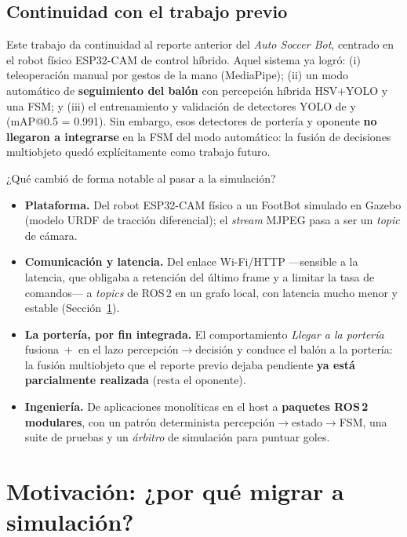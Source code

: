 \documentclass[11pt,a4paper]{article}
\newcommand{\code}[1]{\texttt{\detokenize{#1}}}
\begin{document}
\subsection{Continuidad con el trabajo previo}
Este trabajo da continuidad al reporte anterior del \emph{Auto Soccer Bot}, centrado en el robot físico
ESP32\mbox{-}CAM de control híbrido. Aquel sistema ya logró: (i) teleoperación manual por gestos de la
mano (MediaPipe); (ii) un modo automático de \textbf{seguimiento del balón} con percepción híbrida
HSV+YOLO y una FSM; y (iii) el entrenamiento y validación de detectores YOLO de \code{goal} y
\code{opponent} (mAP@0.5 = 0.991). Sin embargo, esos detectores de portería y oponente \textbf{no
llegaron a integrarse} en la FSM del modo automático: la fusión de decisiones multiobjeto quedó
explícitamente como trabajo futuro.

¿Qué cambió de forma notable al pasar a la simulación?
\begin{itemize}
  \item \textbf{Plataforma.} Del robot ESP32\mbox{-}CAM físico a un FootBot simulado en Gazebo (modelo
  URDF de tracción diferencial); el \emph{stream} MJPEG pasa a ser un \emph{topic} de cámara.
  \item \textbf{Comunicación y latencia.} Del enlace Wi\mbox{-}Fi/HTTP —sensible a la latencia, que
  obligaba a retención del último frame y a limitar la tasa de comandos— a \emph{topics} de ROS\,2 en un
  grafo local, con latencia mucho menor y estable (Sección~\ref{sec:motivacion}).
  \item \textbf{La portería, por fin integrada.} El comportamiento \emph{Llegar a la portería} fusiona
  \code{ball}\,+\,\code{goal} en el lazo percepción$\to$decisión y conduce el balón a la portería: la
  fusión multiobjeto que el reporte previo dejaba pendiente \textbf{ya está parcialmente realizada}
  (resta el oponente).
  \item \textbf{Ingeniería.} De aplicaciones monolíticas en el host a \textbf{paquetes ROS\,2 modulares},
  con un patrón determinista percepción$\to$estado$\to$FSM, una suite de pruebas y un \emph{árbitro} de
  simulación para puntuar goles.
\end{itemize}

\section{Motivación: ¿por qué migrar a simulación?}
\label{sec:motivacion}
\end{document}
